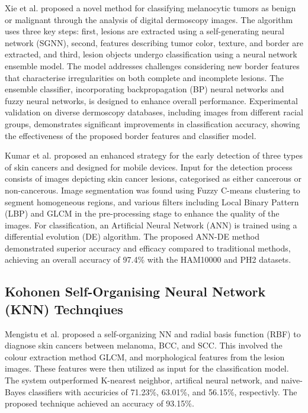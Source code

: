 Xie et al.\cite{Xie2017} proposed a novel method for classifying melanocytic tumors as benign or malignant through the analysis of digital dermoscopy images. The algorithm uses three key steps: first, lesions are extracted using a self-generating neural network (SGNN), second, features describing tumor color, texture, and border are extracted, and third, lesion objects undergo classification using a neural network ensemble model. The model addresses challenges considering new border features that characterise irregularities on both complete and incomplete lesions. The ensemble classifier, incorporating backpropagation (BP) neural networks and fuzzy neural networks, is designed to enhance overall performance. Experimental validation on diverse dermoscopy databases, including images from different racial groups, demonstrates significant improvements in classification accuracy, showing the effectiveness of the proposed border features and classifier model.

Kumar et al.\cite{Kumar2020} proposed an enhanced strategy for the early detection of three types of skin cancers and designed for mobile devices. Input for the detection process consists of images depicting skin cancer lesions, categorised as either cancerous or non-cancerous. Image segmentation was found using Fuzzy C-means clustering to segment homogeneous regions, and various filters including Local Binary Pattern (LBP) and GLCM in the pre-processing stage to enhance the quality of the images. For classification, an Artificial Neural Network (ANN) is trained using a differential evolution (DE) algorithm. The proposed ANN-DE method demonstrated superior accuracy and efficacy compared to traditional methods, achieving an overall accuracy of 97.4\% with the HAM10000 and PH2 datasets.

\subsection{Kohonen Self-Organising Neural Network (KNN) Technqiues}

Mengistu et al.\cite{Debasu2015} proposed a self-organizing NN and radial basis function (RBF) to diagnose skin cancers between melanoma, BCC, and SCC. This involved the colour extraction method GLCM, and morphological features from the lesion images. These features were then utilized as input for the classification model. The system outperformed K-nearest neighbor, artifical neural network, and naive-Bayes classifiers with accuricies of 71.23\%, 63.01\%, and 56.15\%, respectivly. The proposed technique achieved an accuracy of 93.15\%.

